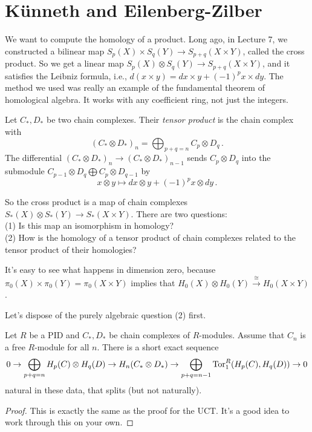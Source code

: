 \section{K\"{u}nneth and Eilenberg-Zilber}
We want to compute the homology of a product. Long ago, in Lecture 7, we constructed a bilinear map $S_p(X)\times S_q(Y)\to S_{p+q}(X\times Y)$, called the cross product. So we get a linear map $S_p(X)\otimes S_q(Y)\to S_{p+q}(X\times Y)$, and it satisfies the Leibniz formula, i.e., $d(x\times y)=dx\times y+(-1)^px\times dy$. The method we used was really an example of the fundamental theorem of homological algebra. It works with any coefficient ring, not just the integers. 
\begin{definition}
Let $C_\ast,D_\ast$ be two chain complexes. Their {\em tensor product} is 
the chain complex with
\[
(C_\ast\otimes D_\ast)_n=\bigoplus_{p+q=n}C_p\otimes D_q\,.
\]
The differential $(C_\ast\otimes D_\ast)_n\to (C_\ast\otimes D_\ast)_{n-1}$ sends $C_p\otimes D_q$ into the submodule $C_{p-1}\otimes D_q\bigoplus C_p\otimes D_{q-1}$ by 
\[
x\otimes y\mapsto dx\otimes y+(-1)^p x\otimes dy\,.
\]
\end{definition}
So the cross product is a map of chain complexes $S_\ast(X)\otimes S_\ast(Y)\to S_\ast(X\times Y)$. There are two questions:\\
(1) Is this map an isomorphism in homology? \\
(2) How is the homology of a tensor product of chain complexes related to the
tensor product of their homologies? 

It's easy to see what happens in dimension zero, because 
$\pi_0(X)\times \pi_0(Y)=\pi_0(X\times Y)$
implies that 
$H_0(X)\otimes H_0(Y)\xrightarrow{\cong}H_0(X\times Y)$.

Let's dispose of the purely algebraic question (2) first. 

\begin{theorem}
Let $R$ be a PID and $C_\ast,D_\ast$ be chain complexes of $R$-modules. 
Assume that $C_n$ is a free $R$-module for all $n$. There is a short
exact sequence
\begin{equation*}
0\to\bigoplus_{p+q=n} H_p(C)\otimes H_q(D)\to H_n(C_\ast\otimes D_\ast)
\to \bigoplus_{p+q=n-1}\operatorname{Tor}^R_1( H_p(C), H_q(D))\to 0
\end{equation*}
natural in these data, that splits (but not naturally).
\end{theorem}
\begin{proof}
This is exactly the same as the proof for the UCT. It's a good idea to work through this on your own.
\end{proof}

